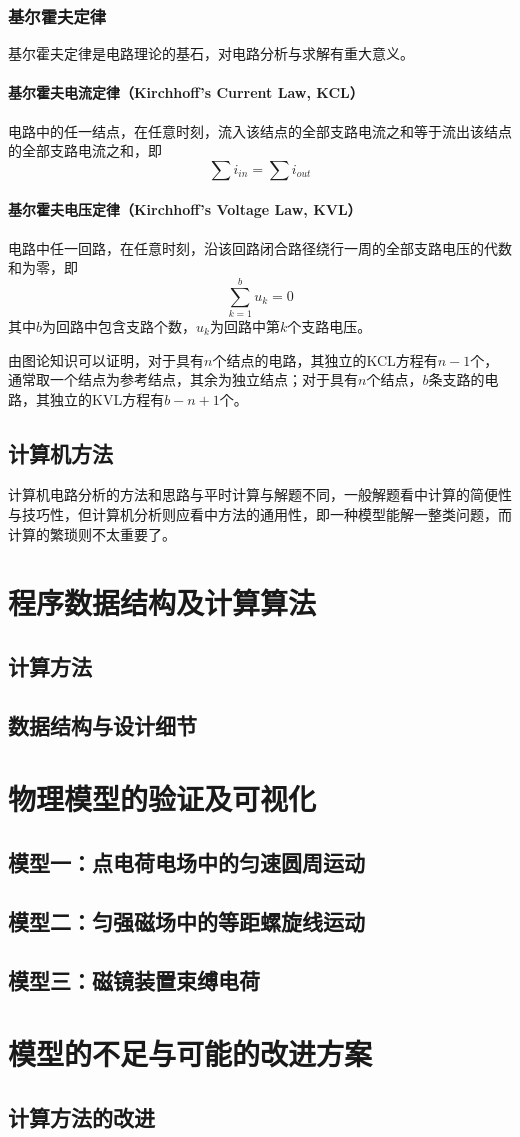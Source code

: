 \documentclass[UTF-8,cs4size]{ctexart}
\begin{document}
\subsubsection{基尔霍夫定律}
基尔霍夫定律是电路理论的基石，对电路分析与求解有重大意义。


\paragraph{\textbf{基尔霍夫电流定律（Kirchhoff's Current Law, KCL）}} 电路中的任一结点，在任意时刻，流入该结点的全部支路电流之和等于流出该结点的全部支路电流之和，即
\begin{equation}
	\sum i_{in} = \sum i_{out}
\end{equation}
\paragraph{\textbf{基尔霍夫电压定律（Kirchhoff's Voltage Law, KVL）}} 电路中任一回路，在任意时刻，沿该回路闭合路径绕行一周的全部支路电压的代数和为零，即
\begin{equation}
	\sum_{k=1}^{b}u_k = 0
\end{equation}
其中$b$为回路中包含支路个数，$u_k$为回路中第$k$个支路电压。


由图论知识可以证明，对于具有$n$个结点的电路，其独立的KCL方程有$n-1$个，通常取一个结点为参考结点，其余为独立结点；对于具有$n$个结点，$b$条支路的电路，其独立的KVL方程有$b-n+1$个。
\subsection{计算机方法}
计算机电路分析的方法和思路与平时计算与解题不同，一般解题看中计算的简便性与技巧性，但计算机分析则应看中方法的通用性，即一种模型能解一整类问题，而计算的繁琐则不太重要了。

\section{程序数据结构及计算算法}
\subsection{计算方法}
\subsection{数据结构与设计细节}
\section{物理模型的验证及可视化}
\subsection{模型一：点电荷电场中的匀速圆周运动}
\subsection{模型二：匀强磁场中的等距螺旋线运动}
\subsection{模型三：磁镜装置束缚电荷}
\section{模型的不足与可能的改进方案}
\subsection{计算方法的改进}
\end{document}
